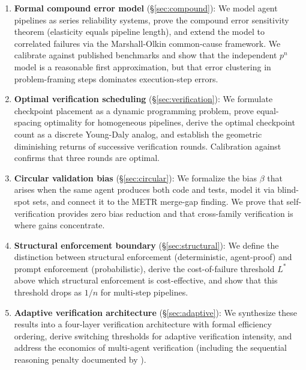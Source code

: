 \documentclass[11pt, a4paper, logo, copyright]{googledeepmind}
\begin{document}
\begin{enumerate}
\item \textbf{Formal compound error model} (\S\ref{sec:compound}): We model agent pipelines as series reliability systems, prove the compound error sensitivity theorem (elasticity equals pipeline length), and extend the model to correlated failures via the Marshall-Olkin common-cause framework. We calibrate against published benchmarks and show that the independent $p^n$ model is a reasonable first approximation, but that error clustering in problem-framing steps dominates execution-step errors.

\item \textbf{Optimal verification scheduling} (\S\ref{sec:verification}): We formulate checkpoint placement as a dynamic programming problem, prove equal-spacing optimality for homogeneous pipelines, derive the optimal checkpoint count as a discrete Young-Daly analog, and establish the geometric diminishing returns of successive verification rounds. Calibration against \citet{hariharan2025plan} confirms that three rounds are optimal.

\item \textbf{Circular validation bias} (\S\ref{sec:circular}): We formalize the bias $\beta$ that arises when the same agent produces both code and tests, model it via blind-spot sets, and connect it to the METR merge-gap finding. We prove that self-verification provides zero bias reduction and that cross-family verification is where gains concentrate.

\item \textbf{Structural enforcement boundary} (\S\ref{sec:structural}): We define the distinction between structural enforcement (deterministic, agent-proof) and prompt enforcement (probabilistic), derive the cost-of-failure threshold $L^*$ above which structural enforcement is cost-effective, and show that this threshold drops as $1/n$ for multi-step pipelines.

\item \textbf{Adaptive verification architecture} (\S\ref{sec:adaptive}): We synthesize these results into a four-layer verification architecture with formal efficiency ordering, derive switching thresholds for adaptive verification intensity, and address the economics of multi-agent verification (including the sequential reasoning penalty documented by \citeauthor{google2025scaling}).
\end{enumerate}

\end{document}
